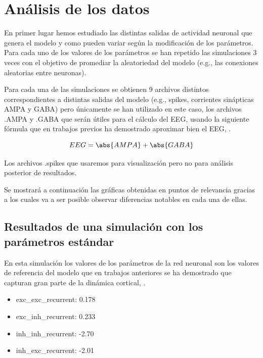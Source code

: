 \documentclass[oneside,openright,titlepage,numbers=noenddot,openany,headinclude,footinclude=true,
cleardoublepage=empty,abstractoff,BCOR=5mm,paper=a4,fontsize=12pt,main=spanish]{scrreprt}
\begin{document}
\section{Análisis de los datos}\label{part:analisis}

En primer lugar hemos estudiado las distintas salidas de actividad neuronal que genera el modelo y como pueden variar según la modificación de los parámetros. Para cada uno de los valores de los parámetros se han repetido las simulaciones 3 veces con el objetivo de promediar la aleatoriedad del modelo (e.g., las conexiones aleatorias entre neuronas).

Para cada una de las simulaciones se obtienen 9 archivos distintos correspondientes a distintas salidas del modelo (e.g., spikes, corrientes sinápticas AMPA y GABA) pero únicamente se han utilizado en este caso, los archivos .AMPA y .GABA que serán útiles para el cálculo del EEG, usando la siguiente fórmula que en trabajos previos ha demostrado aproximar bien el EEG, \cite{computationoftheelectroencephalogram}.

\begin{equation}
    EEG = \abs{AMPA} + \abs{GABA}
\end{equation}

Los archivos .spikes que usaremos para visualización pero no para análisis posterior de resultados.

Se mostrará a continuación las gráficas obtenidas en puntos de relevancia gracias a los cuales va a ser posible observar diferencias notables en cada una de ellas.

\newpage
\subsection{Resultados de una simulación con los parámetros estándar}

En esta simulación los valores de los parámetros de la red neuronal son los valores de referencia del modelo que en trabajos anteriores se ha demostrado que capturan gran parte de la dinámica cortical, \cite{encodigofnaturalistic}.

\begin{itemize}
    \item exc\_exc\_recurrent: 0.178
    \item exc\_inh\_recurrent: 0.233
    \item inh\_inh\_recurrent: -2.70
    \item inh\_exc\_recurrent: -2.01
\end{itemize}
\end{document}
